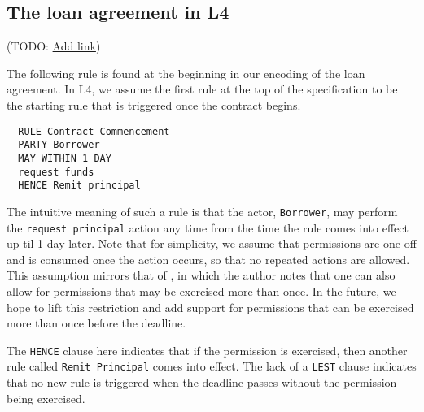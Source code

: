 \documentclass{article}
\begin{document}



\subsection{The loan agreement in L4}
(TODO:
\href{
  https://docs.google.com/spreadsheets/d/1_k17mzk2hTyPY2egbEVqXzr8uYAdi6BVqeMYdBxKB_I/edit#gid=864296175
}{Add link})

The following rule is found at the beginning in our encoding of the loan
agreement.
In L4, we assume the first rule at the top of the specification to be
the starting rule that is triggered once the contract begins.

\begin{lstlisting}
  RULE Contract Commencement
  PARTY Borrower
  MAY WITHIN 1 DAY
  request funds
  HENCE Remit principal
\end{lstlisting}

The intuitive meaning of such a rule is that the actor, \texttt{Borrower},
may perform the \texttt{request principal} action any time from the time the
rule comes into effect up til 1 day later.
Note that for simplicity, we assume that permissions are one-off and is
consumed once the action occurs, so that no repeated actions are allowed.
This assumption mirrors that of \cite{real_time_contract_automata}, in which
the author notes that one can also allow for permissions that may be exercised
more than once.
In the future, we hope to lift this restriction and add support for permissions
that can be exercised more than once before the deadline.

The \texttt{HENCE} clause here indicates that if the permission is exercised,
then another rule called \texttt{Remit Principal} comes into effect.
The lack of a \texttt{LEST} clause indicates that no new rule is triggered
when the deadline passes without the permission being exercised.
\end{document}
